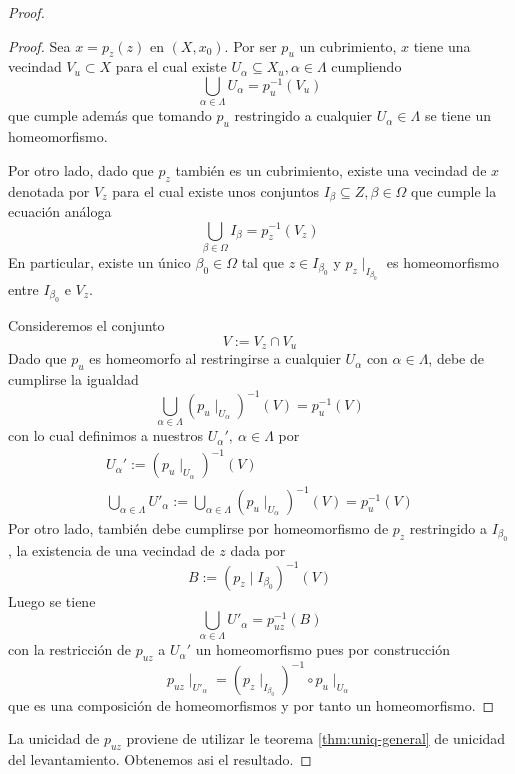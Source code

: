 \begin{proof}
\begin{proof}
  Sea \(x = p_z (z)\) en \((X,x_0)\). Por ser \(p_u\) un cubrimiento,
  \(x\) tiene una vecindad \(V_u \subset X\) para el cual existe
  \(U_\alpha \subseteq X_u, \alpha \in \Lambda\) cumpliendo
  \[ \bigcup_{\alpha \in \Lambda} U_\alpha = p_u^{-1} (V_u)\]
  que cumple además que tomando \(p_u\) restringido a cualquier \(U_\alpha
  \in \Lambda\) se tiene un homeomorfismo.

  Por otro lado, dado que \(p_z\) también es un cubrimiento, existe una
  vecindad de \(x\) denotada por \(V_z\) para el cual existe unos
  conjuntos \(I_\beta \subseteq Z, \beta \in \Omega\) que cumple la
  ecuación análoga
  \[ \bigcup_{\beta \in \Omega} I_\beta = p_z^{-1} (V_z) \]
  En particular, existe un único \(\beta_0 \in \Omega\) tal que \( z \in
  I_{\beta_0} \) y \( p_{z} \mid_{I_{\beta_0}} \) es homeomorfismo entre
  \(I_{\beta_0}\) e \(V_z\).

  Consideremos el conjunto
  \[ V := V_z \cap V_u \]
  Dado que \(p_u\) es homeomorfo al restringirse a cualquier
  \(U_\alpha\) con \(\alpha \in \Lambda\), debe de cumplirse la igualdad
  \[ \bigcup_{\alpha \in
      \Lambda} \left( p_u \mid_{U_\alpha} \right)^{-1} (V) = p_u^{-1} (V) \]
  con lo cual definimos a nuestros \(U_\alpha ',\ \alpha \in \Lambda\) por
  \begin{gather*}
    U_\alpha ' := \left( p_u \mid_{U_\alpha} \right)^{-1} (V) \\
    \bigcup_{\alpha \in \Lambda} U'_\alpha := \bigcup_{\alpha \in
        \Lambda} \left( p_u \mid_{U_\alpha} \right)^{-1} (V) = p_u^{-1}
        (V)
  \end{gather*}
  Por otro lado, también debe cumplirse por homeomorfismo de \(p_z\)
  restringido a \(I_{\beta_0}\), la existencia de una vecindad de \(z\)
  dada por
  \[ B := \left( p_z \mid I_{\beta_0} \right) ^{-1} (V) \]
  Luego se tiene
  \[ \bigcup_{\alpha \in \Lambda} U'_\alpha = p_{uz}^{-1} (B) \]
  con la restricción de \(p_{uz}\) a \(U_\alpha '\) un homeomorfismo
  pues por construcción
  \[ p_{uz}\mid_{U' _\alpha} = \left( p_z \mid_{I_{\beta _0}}
     \right)^{-1} \circ p_u \mid_{U_\alpha} \]
  que es una composición de homeomorfismos y por tanto un homeomorfismo.
  \end{proof}

  La unicidad de \(p_{uz}\) proviene de utilizar le teorema
  \ref{thm:uniq-general} de unicidad del levantamiento. Obtenemos asi el
  resultado.
\end{proof}

